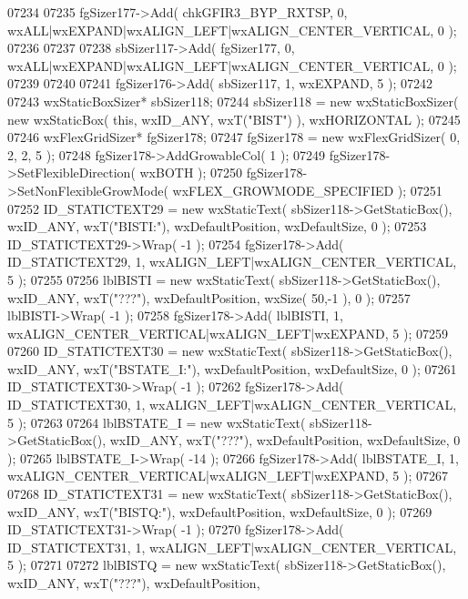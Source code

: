 \begin{DoxyCode}
07234     
07235     fgSizer177->Add( chkGFIR3_BYP_RXTSP, 0, wxALL|wxEXPAND|wxALIGN\_LEFT|wxALIGN\_CENTER\_VERTICAL, 0 );
07236     
07237     
07238     sbSizer117->Add( fgSizer177, 0, wxALL|wxEXPAND|wxALIGN\_LEFT|wxALIGN\_CENTER\_VERTICAL, 0 );
07239     
07240     
07241     fgSizer176->Add( sbSizer117, 1, wxEXPAND, 5 );
07242     
07243     wxStaticBoxSizer* sbSizer118;
07244     sbSizer118 = \textcolor{keyword}{new} wxStaticBoxSizer( \textcolor{keyword}{new} wxStaticBox( \textcolor{keyword}{this}, wxID\_ANY, wxT(\textcolor{stringliteral}{"BIST"}) ), wxHORIZONTAL );
07245     
07246     wxFlexGridSizer* fgSizer178;
07247     fgSizer178 = \textcolor{keyword}{new} wxFlexGridSizer( 0, 2, 2, 5 );
07248     fgSizer178->AddGrowableCol( 1 );
07249     fgSizer178->SetFlexibleDirection( wxBOTH );
07250     fgSizer178->SetNonFlexibleGrowMode( wxFLEX\_GROWMODE\_SPECIFIED );
07251     
07252     ID_STATICTEXT29 = \textcolor{keyword}{new} wxStaticText( sbSizer118->GetStaticBox(), wxID\_ANY, wxT(\textcolor{stringliteral}{"BISTI:"}), 
      wxDefaultPosition, wxDefaultSize, 0 );
07253     ID_STATICTEXT29->Wrap( -1 );
07254     fgSizer178->Add( ID_STATICTEXT29, 1, wxALIGN\_LEFT|wxALIGN\_CENTER\_VERTICAL, 5 );
07255     
07256     lblBISTI = \textcolor{keyword}{new} wxStaticText( sbSizer118->GetStaticBox(), wxID\_ANY, wxT(\textcolor{stringliteral}{"???"}), wxDefaultPosition, 
      wxSize( 50,-1 ), 0 );
07257     lblBISTI->Wrap( -1 );
07258     fgSizer178->Add( lblBISTI, 1, wxALIGN\_CENTER\_VERTICAL|wxALIGN\_LEFT|wxEXPAND, 5 );
07259     
07260     ID_STATICTEXT30 = \textcolor{keyword}{new} wxStaticText( sbSizer118->GetStaticBox(), wxID\_ANY, wxT(\textcolor{stringliteral}{"BSTATE\_I:"}), 
      wxDefaultPosition, wxDefaultSize, 0 );
07261     ID_STATICTEXT30->Wrap( -1 );
07262     fgSizer178->Add( ID_STATICTEXT30, 1, wxALIGN\_LEFT|wxALIGN\_CENTER\_VERTICAL, 5 );
07263     
07264     lblBSTATE_I = \textcolor{keyword}{new} wxStaticText( sbSizer118->GetStaticBox(), wxID\_ANY, wxT(\textcolor{stringliteral}{"???"}), wxDefaultPosition, 
      wxDefaultSize, 0 );
07265     lblBSTATE_I->Wrap( -14 );
07266     fgSizer178->Add( lblBSTATE_I, 1, wxALIGN\_CENTER\_VERTICAL|wxALIGN\_LEFT|wxEXPAND, 5 );
07267     
07268     ID_STATICTEXT31 = \textcolor{keyword}{new} wxStaticText( sbSizer118->GetStaticBox(), wxID\_ANY, wxT(\textcolor{stringliteral}{"BISTQ:"}), 
      wxDefaultPosition, wxDefaultSize, 0 );
07269     ID_STATICTEXT31->Wrap( -1 );
07270     fgSizer178->Add( ID_STATICTEXT31, 1, wxALIGN\_LEFT|wxALIGN\_CENTER\_VERTICAL, 5 );
07271     
07272     lblBISTQ = \textcolor{keyword}{new} wxStaticText( sbSizer118->GetStaticBox(), wxID\_ANY, wxT(\textcolor{stringliteral}{"???"}), wxDefaultPosition, 

\end{DoxyCode}
